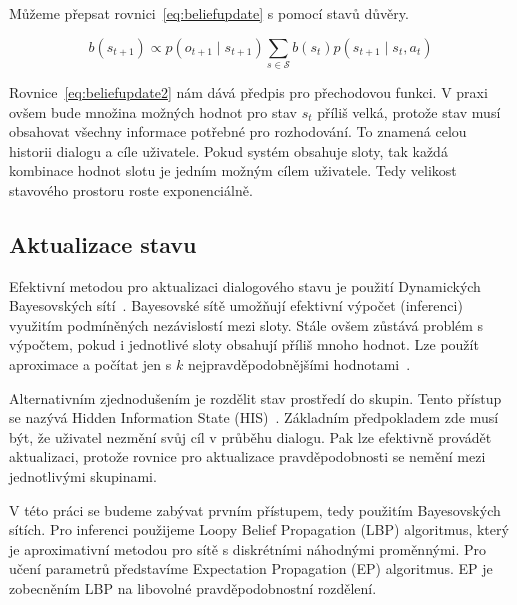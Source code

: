 Můžeme přepsat rovnici~\eqref{eq:beliefupdate} s pomocí stavů důvěry.

\begin{equation}
b(s_{t+1}) \propto
    p(o_{t+1} \mid s_{t+1})
    \sum_{s \in \mathcal{S}}
        b(s_t)
        p(s_{t+1} \mid s_t, a_t)
\label{eq:beliefupdate2}
\end{equation}

Rovnice~\eqref{eq:beliefupdate2} nám dává předpis pro přechodovou funkci.
V praxi ovšem bude množina možných hodnot pro stav $s_t$ příliš velká, protože stav musí obsahovat všechny informace potřebné pro rozhodování.
To znamená celou historii dialogu a cíle uživatele. 
Pokud systém obsahuje sloty, tak každá kombinace hodnot slotu je jedním možným cílem uživatele. 
Tedy velikost stavového prostoru roste exponenciálně.

\subsection{Aktualizace stavu}

Efektivní metodou pro aktualizaci dialogového stavu je použití Dynamických Bayesovských sítí~\cite{thomson2008bayesian}.
Bayesovské sítě umožňují efektivní výpočet (inferenci) využitím podmíněných nezávislostí mezi sloty.
Stále ovšem zůstává problém s výpočtem, pokud i jednotlivé sloty obsahují příliš mnoho hodnot.
Lze použít aproximace a počítat jen s $k$ nejpravděpodobnějšími hodnotami~\cite{thomson2010bayesian}.

Alternativním zjednodušením je rozdělit stav prostředí do skupin. 
Tento přístup se nazývá Hidden Information State (HIS)~\cite{young2010hidden}.
Základním předpokladem zde musí být, že uživatel nezmění svůj cíl v průběhu dialogu.
Pak lze efektivně provádět aktualizaci, protože rovnice pro aktualizace pravděpodobnosti se nemění mezi jednotlivými skupinami.

V této práci se budeme zabývat prvním přístupem, tedy použitím Bayesovských sítích.
Pro inferenci použijeme Loopy Belief Propagation (LBP) algoritmus, který je aproximativní metodou pro sítě s diskrétními náhodnými proměnnými.
Pro učení parametrů představíme Expectation Propagation (EP) algoritmus.
EP je zobecněním LBP na libovolné pravděpodobnostní rozdělení.
